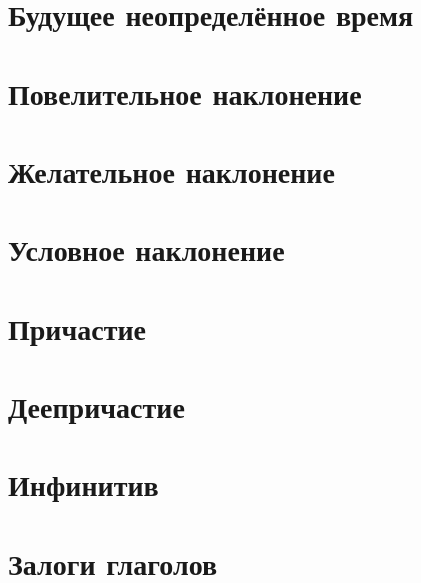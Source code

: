 \documentclass{article}
\begin{document}
\section{Будущее неопределённое время}
\section{Повелительное наклонение}
\section{Желательное наклонение}
\section{Условное наклонение}
\section{Причастие}
\section{Деепричастие}
\section{Инфинитив}
\section{Залоги глаголов}
\end{document}
